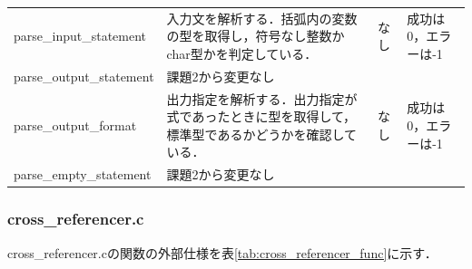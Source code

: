 \documentclass{jlreq}
\begin{document}
\begin{table}[H]
{\begin{tabular}{|l|p{15cm}|l|p{6cm}|}
      parse\_input\_statement         & 入力文を解析する．括弧内の変数の型を取得し，符号なし整数かchar型かを判定している．                                                                                                                                                                             & なし & 成功は0，エラーは-1                \\
      parse\_output\_statement        & 課題2から変更なし                                                                                                                                                                                                                                              & ~    & ~                                  \\
      parse\_output\_format           & 出力指定を解析する．出力指定が式であったときに型を取得して，標準型であるかどうかを確認している．                                                                                                                                                               & なし & 成功は0，エラーは-1                \\
      parse\_empty\_statement         & 課題2から変更なし                                                                                                                                                                                                                                              & ~    & ~                                  \\ \hline
    \end{tabular}
  }
  \label{tab:parser_func}
\end{table}

\subsubsection{cross\_referencer.c}
cross\_referencer.cの関数の外部仕様を表\ref{tab:cross_referencer_func}に示す．
\end{document}
